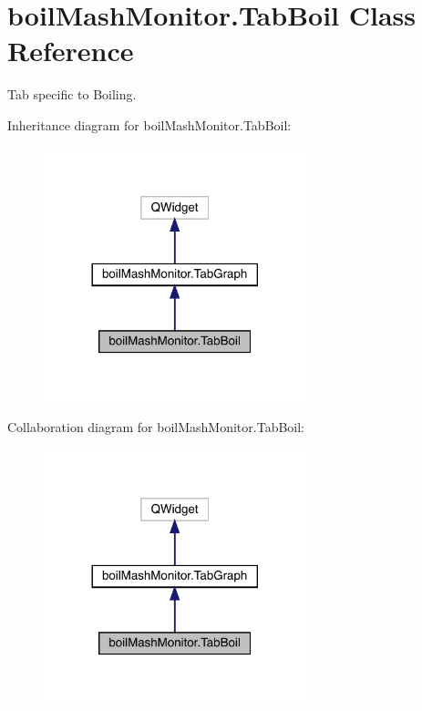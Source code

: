 \hypertarget{classboil_mash_monitor_1_1_tab_boil}{}\section{boil\+Mash\+Monitor.\+Tab\+Boil Class Reference}
\label{classboil_mash_monitor_1_1_tab_boil}


Tab specific to Boiling.  




Inheritance diagram for boil\+Mash\+Monitor.\+Tab\+Boil\+:\nopagebreak
\begin{figure}[H]
\begin{center}
\leavevmode
\includegraphics[width=216pt]{classboil_mash_monitor_1_1_tab_boil__inherit__graph}
\end{center}
\end{figure}


Collaboration diagram for boil\+Mash\+Monitor.\+Tab\+Boil\+:\nopagebreak
\begin{figure}[H]
\begin{center}
\leavevmode
\includegraphics[width=216pt]{classboil_mash_monitor_1_1_tab_boil__coll__graph}
\end{center}
\end{figure}
